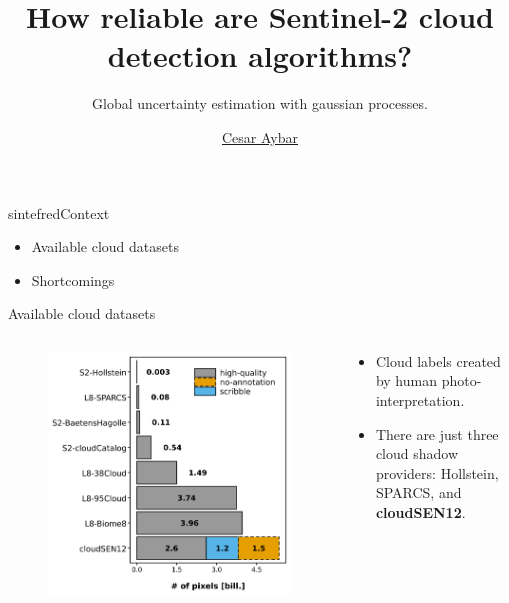 \documentclass{beamer}
\title{How reliable are Sentinel-2 cloud detection algorithms?}
\subtitle{Global uncertainty estimation with gaussian processes.}
\author{\href{mailto:csaybar@gmail.com}{Cesar Aybar}}
\begin{document}
\maketitle


\begin{chapter}{sintefred}{Context}
\begin{itemize}
\item Available cloud datasets
\item Shortcomings
\end{itemize}
\end{chapter}


\begin{frame}{Available cloud datasets}
\begin{columns}
	\begin{column}{0.5\textwidth}
		\begin{figure}
			\includegraphics[width=\textwidth]{images/figure01}
		\end{figure}	
	\end{column}
	\begin{column}{0.5\textwidth}
	\begin{itemize}[<+->]
		\item Cloud labels created by human photo-interpretation.
		\item There are just three cloud shadow providers: Hollstein, SPARCS, and \textbf{cloudSEN12}.
	\end{itemize}
	\end{column}
\end{columns}
\end{frame}
\end{document}
